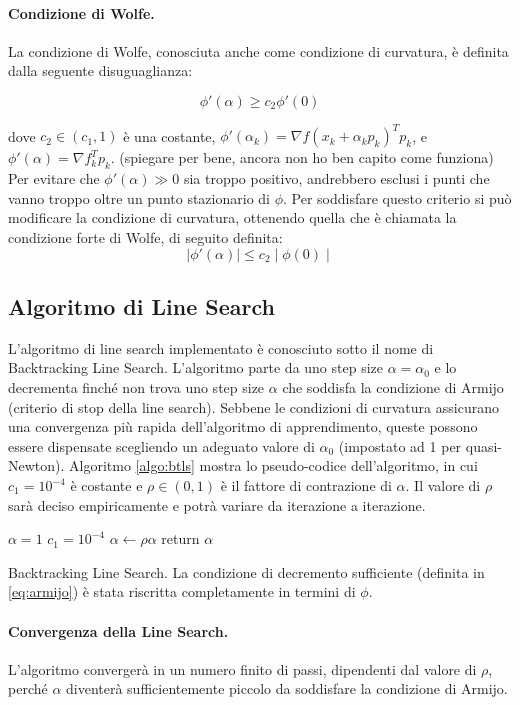 \documentclass[10pt,a4paper]{article}
\begin{document}
\paragraph{Condizione di Wolfe.}
La condizione di Wolfe, conosciuta anche come condizione di curvatura, è definita dalla seguente disuguaglianza:

\begin{equation}
\phi '(\alpha) \geq c_2 \phi '(0)
\end{equation}

dove $c_2 \in (c_1, 1)$ è una costante, $\phi'(\alpha_k) = \nabla f(x_k + \alpha_k p_k)^T p_k$, e $\phi'(\alpha) = \nabla f_k^T p_k$. (spiegare per bene, ancora non ho ben capito come funziona)
Per evitare che $\phi'(\alpha) \gg 0$ sia troppo positivo, andrebbero esclusi i punti che vanno troppo oltre un punto stazionario di $\phi$. Per soddisfare questo criterio si può modificare la condizione di curvatura, ottenendo quella che è chiamata la condizione forte di Wolfe, di seguito definita:
\begin{equation}
\mid \phi'(\alpha) \mid \leq c_2 \mid \phi(0) \mid
\end{equation}

\subsection{Algoritmo di Line Search}
L'algoritmo di line search implementato è conosciuto sotto il nome di Backtracking Line Search. L'algoritmo  parte da uno step size $\alpha = \alpha_0$ e lo decrementa finché non trova uno step size $\alpha$ che soddisfa la condizione di Armijo (criterio di stop della line search). Sebbene le condizioni di curvatura assicurano una convergenza più rapida dell'algoritmo di apprendimento, queste possono essere dispensate scegliendo un adeguato valore di $\alpha_0$ (impostato ad 1 per quasi-Newton).
Algoritmo \ref{algo:btls} mostra lo pseudo-codice dell'algoritmo, in cui $c_1 = 10^{-4}$ è costante e $\rho \in (0,1)$ è il fattore di contrazione di $\alpha$. Il valore di $\rho$ sarà deciso empiricamente e potrà variare da iterazione a iterazione.


\begin{algorithm}[H]
\begin{algorithmic}[1]
\State $\alpha = 1$
\State $c_1 = 10^{-4}$
\State $\alpha \leftarrow \rho \alpha$
\EndWhile
\State return $\alpha$
\end{algorithmic}
\caption{Backtracking Line Search. La condizione di decremento sufficiente (definita in \eqref{eq:armijo}) è stata riscritta completamente in termini di $\phi$.} \label{algo:btls}
\end{algorithm}

\paragraph{Convergenza della Line Search.} L'algoritmo convergerà in un numero finito di passi, dipendenti dal valore di $\rho$, perché $\alpha$ diventerà sufficientemente piccolo da soddisfare la condizione di Armijo. 
\end{document}
